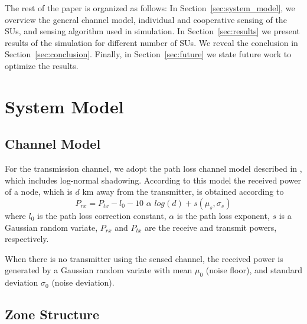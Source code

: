 \documentclass[conference,compsoc]{IEEEtran}
\newcommand{\beqn}{\begin{equation}}
\newcommand{\eeqn}{\end{equation}}
\begin{document}
The rest of the paper is organized as follows: In Section~\ref{sec:system_model}, we overview the general channel model, individual and cooperative sensing of the SUs, and sensing algorithm used in simulation. In Section~\ref{sec:results} we present results of the simulation for different number of SUs. We reveal the conclusion in Section~\ref{sec:conclusion}. Finally, in Section~\ref{sec:future} we state future work to optimize the results.
\section{\label{sec:system_model}System Model}

\subsection{Channel Model}
For the transmission channel, we adopt the path loss channel model described in \cite{faramir}, which includes log-normal shadowing. According to this model the received power of a node, which is $d$ km away from the transmitter, is obtained according to\\
\beqn
    P_{rx} = P_{tx} - l_0 - 10\,\, \alpha \,\, log(d) + s(\mu_s, \sigma_s)
\eeqn
where $l_0$ is the path loss correction constant, $\alpha$ is the path loss exponent, $s$ is a Gaussian random variate,  $P_{rx}$ and $P_{tx}$ are the receive and transmit powers, respectively.

When there is no transmitter using the sensed channel, the received power is generated by a Gaussian random variate with mean $\mu_0$ (noise floor), and standard deviation $\sigma_0$ (noise deviation).

\subsection{Zone Structure}
\end{document}
